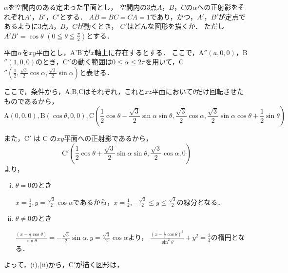 
\begin{problem}
  $\alpha$を空間内のある定まった平面とし，
空間内の3点$A$，$B$，$C$の$\alpha$への正射影をそれぞれ$A'$，$B'$，$C'$とする．
$AB=BC=CA=1$であり，かつ，$A'$，$B'$が定点であるように3点$A$，$B$，$C$が動くとき，
$C'$はどんな図形を描くか．
ただし$A'B'=\cos\theta$ $\displaystyle\left( 0\leqq\theta\leqq\frac{\pi}{2} \right)$とする．
\end{problem}

平面$\alpha$を$xy$平面とし，A'B'が$x$軸上に存在するとする．
ここで，A$''(a,0,0)$，B$''(1,0,0)$のとき，C$''$の動く範囲は$0 \leq \alpha \leq 2\pi$を用いて，C$''\left( \frac12,\frac{\sqrt{3}}2 \cos \alpha, \frac{\sqrt{3}}2 \sin \alpha \right)$と表せる．

ここで，条件から，A,B,Cはそれぞれ，これと$xz$平面において$\theta$だけ回転させたものであるから，
\[\mathrm{A}(0,0,0),\mathrm{B}(\cos \theta,0,0),\mathrm{C}\left( \frac12 \cos \theta - \frac{\sqrt{3}}2 \sin \alpha \sin \theta,\frac{\sqrt{3}}2 \cos \alpha, \frac{\sqrt{3}}2 \sin \alpha \cos \theta + \frac12 \sin \theta \right) \]

また，C$'$ は C の$xy$平面への正射影であるから，
\[\mathrm{C}'\left( \frac12 \cos \theta + \frac{\sqrt3}2 \sin\alpha \sin\theta, \frac{\sqrt3}{2}\cos\alpha, 0 \right)\]
より，
\begin{enumerate}[(i)]
  \item $\theta = 0$のとき

  $x= \frac12, y=\frac{\sqrt3}{2}\cos\alpha$であるから，$x=\frac12, -\frac{\sqrt3}{2} \leq y \leq \frac{\sqrt3}{2}$の線分となる．

  \item $\theta \neq 0$のとき

  $\frac{\left( x-\frac12 \cos\theta \right)}{\sin\theta} = -\frac{\sqrt3}{2}\sin\alpha, y = \frac{\sqrt3}{2}\cos\alpha$より，
  $\frac{\left( x-\frac12 \cos\theta \right)^2}{\sin^2\theta} + y^2 = \frac34$の楕円となる．
\end{enumerate}

よって，(i),(ii)から，C$'$が描く図形は，

